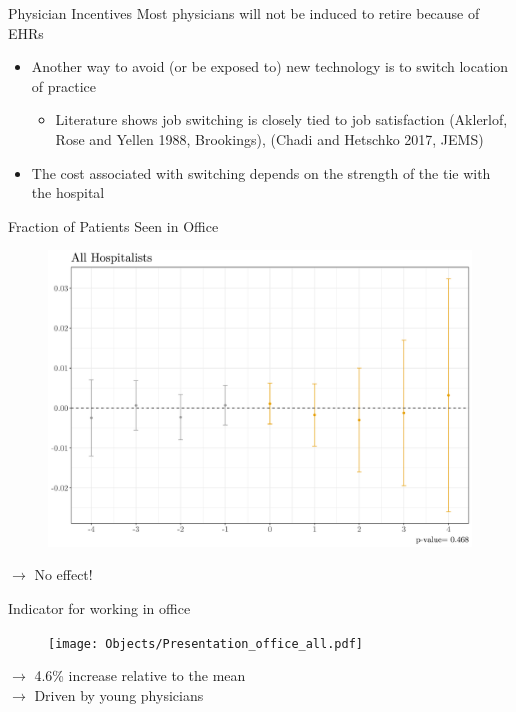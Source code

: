 \documentclass[10pt]{beamer}
\begin{document}
\begin{frame}{Physician Incentives}
Most physicians will not be induced to retire because of EHRs
    \begin{itemize}
        \item Another way to avoid (or be exposed to) new technology is to switch location of practice
        \begin{itemize}
            \vspace{3mm}
            \item Literature shows job switching is closely tied to job satisfaction \tiny (Aklerlof, Rose and Yellen 1988, Brookings), (Chadi and Hetschko 2017, JEMS)
        \end{itemize}
        \vspace{6mm}
        \pause
        \item The cost associated with switching depends on the strength of the tie with the hospital
    \end{itemize}
\end{frame}

\begin{frame}{Fraction of Patients Seen in Office}
\begin{figure}[ht]
    \centering
    \includegraphics[scale=.35]{Objects/Presentation_fracoffice_all.pdf}
\end{figure}
$\rightarrow$ No effect!
\end{frame}

\begin{frame}{Indicator for working in office}
\begin{figure}[ht]
    \centering
    \texttt{[image: Objects/Presentation\_office\_all.pdf]}
\end{figure}
$\rightarrow$ 4.6\% increase relative to the mean\\
$\rightarrow$ Driven by young physicians
\end{frame}
\end{document}
